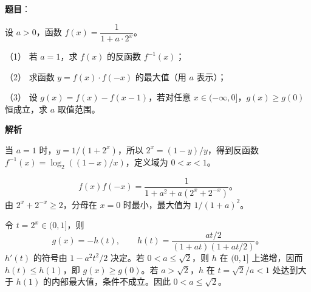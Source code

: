 \begin{answer}

\textbf{题目}：

设 $a>0$，函数 $f(x)=\dfrac{1}{1+a\cdot2^x}$。

（1） 若 $a=1$，求 $f(x)$ 的反函数 $f^{-1}(x)$；

（2） 求函数 $y=f(x)\cdot f(-x)$ 的最大值（用 $a$ 表示）；

（3） 设 $g(x)=f(x)-f(x-1)$，若对任意 $x\in(-\infty,0]$，$g(x)\geq g(0)$ 恒成立，求 $a$ 取值范围。

\textbf{解析}


当 $a=1$ 时，$y=1/(1+2^x)$，所以 $2^x=(1-y)/y$，得到反函数 $f^{-1}(x)=\log_2((1-x)/x)$，定义域为 $0<x<1$。


\nopagebreak[4]
\[
f(x)f(-x)=\frac1{1+a^2+a(2^x+2^{-x})}\text{。}
\]
由 $2^x+2^{-x}\geq2$，分母在 $x=0$ 时最小，最大值为 $1/(1+a)^2$。


令 $t=2^x\in(0,1]$，则
\nopagebreak[4]
\[
g(x)=-h(t),\qquad
h(t)=\frac{at/2}{(1+at)(1+at/2)}\text{。}
\]
$h'(t)$ 的符号由 $1-a^2t^2/2$ 决定。若 $0<a\leq\sqrt2$，则 $h$ 在 $(0,1]$ 上递增，因而 $h(t)\leq h(1)$，即 $g(x)\geq g(0)$。若 $a>\sqrt2$，$h$ 在 $t=\sqrt2/a<1$ 处达到大于 $h(1)$ 的内部最大值，条件不成立。因此 $0<a\leq\sqrt2$。




\end{answer}
